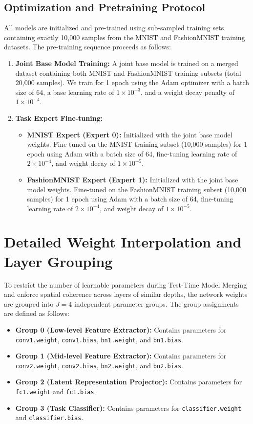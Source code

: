 \documentclass{article}
\theoremstyle{plain}
\theoremstyle{definition}
\theoremstyle{remark}
\begin{document}
\subsection{Optimization and Pretraining Protocol}
All models are initialized and pre-trained using sub-sampled training sets containing exactly 10,000 samples from the MNIST and FashionMNIST training datasets.
The pre-training sequence proceeds as follows:
\begin{enumerate}
    \item \textbf{Joint Base Model Training:} A joint base model is trained on a merged dataset containing both MNIST and FashionMNIST training subsets (total 20,000 samples). We train for 1 epoch using the Adam optimizer with a batch size of 64, a base learning rate of $1 \times 10^{-3}$, and a weight decay penalty of $1 \times 10^{-4}$.
    \item \textbf{Task Expert Fine-tuning:}
    \begin{itemize}
        \item \textbf{MNIST Expert (Expert 0):} Initialized with the joint base model weights. Fine-tuned on the MNIST training subset (10,000 samples) for 1 epoch using Adam with a batch size of 64, fine-tuning learning rate of $2 \times 10^{-4}$, and weight decay of $1 \times 10^{-5}$.
        \item \textbf{FashionMNIST Expert (Expert 1):} Initialized with the joint base model weights. Fine-tuned on the FashionMNIST training subset (10,000 samples) for 1 epoch using Adam with a batch size of 64, fine-tuning learning rate of $2 \times 10^{-4}$, and weight decay of $1 \times 10^{-5}$.
    \end{itemize}
\end{enumerate}

\section{Detailed Weight Interpolation and Layer Grouping}
\label{app:parameter_interpolation}

To restrict the number of learnable parameters during Test-Time Model Merging and enforce spatial coherence across layers of similar depths, the network weights are grouped into $J = 4$ independent parameter groups. The group assignments are defined as follows:
\begin{itemize}
    \item \textbf{Group 0 (Low-level Feature Extractor):} Contains parameters for \texttt{conv1.weight}, \texttt{conv1.bias}, \texttt{bn1.weight}, and \texttt{bn1.bias}.
    \item \textbf{Group 1 (Mid-level Feature Extractor):} Contains parameters for \texttt{conv2.weight}, \texttt{conv2.bias}, \texttt{bn2.weight}, and \texttt{bn2.bias}.
    \item \textbf{Group 2 (Latent Representation Projector):} Contains parameters for \texttt{fc1.weight} and \texttt{fc1.bias}.
    \item \textbf{Group 3 (Task Classifier):} Contains parameters for \texttt{classifier.weight} and \texttt{classifier.bias}.
\end{itemize}
\end{document}

